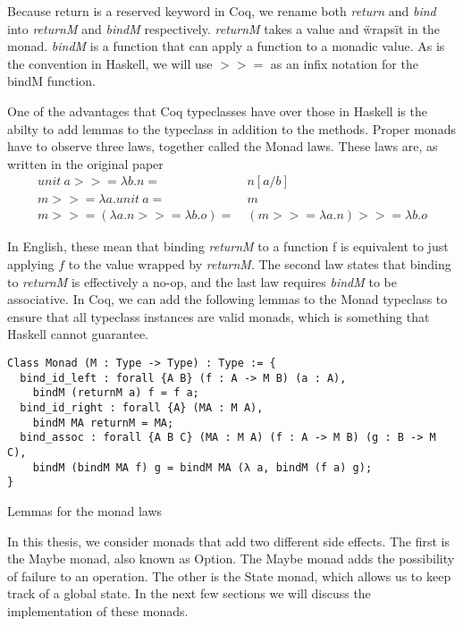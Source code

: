 Because return is a reserved keyword in Coq, we rename both \textit{return} and 
\textit{bind} into \textit{returnM} and \textit{bindM} respectively.
\textit{returnM} takes a value and \"wraps\" it in the monad. \textit{bindM} is
a function that can apply a function to a monadic value. As is the convention
in Haskell, we will use $>>=$ as an infix notation for the bindM
function.

One of the advantages that Coq typeclasses have over those in Haskell is the
abilty to add lemmas to the typeclass in addition to the methods. Proper monads
have to observe three laws, together called the Monad laws. These laws are, as
written in the original paper
\begin{align*}
    \textit{unit}\ a >>= \lambda b. n =&\ n[a/b] \\
    m >>= \lambda a . \textit{unit}\ a =&\ m \\
    m >>= (\lambda a.n >>= \lambda b.o) =&\ (m >>= \lambda a.n) >>= \lambda b.o
\end{align*}

In English, these mean that binding \textit{returnM} to a function f is
equivalent to just applying $f$ to the value wrapped by \textit{returnM}. The
second law states that binding to \textit{returnM} is effectively a no-op, and
the last law requires \textit{bindM} to be associative. In Coq, we can add the
following lemmas to the Monad typeclass to ensure that all typeclass instances
are valid monads, which is something that Haskell cannot guarantee. 

\begin{listing}[H]
\begin{verbatim}
Class Monad (M : Type -> Type) : Type := {
  bind_id_left : forall {A B} (f : A -> M B) (a : A), 
    bindM (returnM a) f = f a;
  bind_id_right : forall {A} (MA : M A),
    bindM MA returnM = MA;
  bind_assoc : forall {A B C} (MA : M A) (f : A -> M B) (g : B -> M C),
    bindM (bindM MA f) g = bindM MA (λ a, bindM (f a) g);
}
\end{verbatim}
\caption{Lemmas for the monad laws}
\label{lst:monad_lemmas}
\end{listing}

In this thesis, we consider monads that add two different side effects. The
first is the Maybe monad, also known as Option. The Maybe monad adds the
possibility of failure to an operation. The other is the State monad, which
allows us to keep track of a global state. In the next few sections we will
discuss the implementation of these monads.

